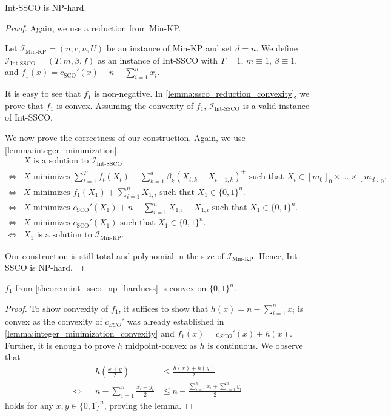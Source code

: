 \begin{theorem}
\label{theorem:int_ssco_np_hardness}
Int-SSCO is NP-hard.
\end{theorem}
\begin{proof}
Again, we use a reduction from Min-KP.

Let $\mathcal{I}_{\text{Min-KP}} = (n, c, u, U)$ be an instance of Min-KP and set $d = n$. We define $\mathcal{I}_{\text{Int-SSCO}} = (T, m, \beta, f)$ as an instance of Int-SSCO with $T = 1$, $m \equiv 1$, $\beta \equiv 1$, and $f_1(x) = c_{\text{SCO}}'(x) + n - \sum_{i=1}^n x_i$.

It is easy to see that $f_1$ is non-negative. In \autoref{lemma:ssco_reduction_convexity}, we prove that $f_1$ is convex. Assuming the convexity of $f_1$, $\mathcal{I}_{\text{Int-SSCO}}$ is a valid instance of Int-SSCO.

We now prove the correctness of our construction. Again, we use \autoref{lemma:integer_minimization}. \begin{align*}
         &X \text{ is a solution to } \mathcal{I}_{\text{Int-SSCO}} \\
    \iff &X \text{ minimizes } \sum_{t=1}^T f_t(X_t) + \sum_{k=1}^d \beta_k (X_{t,k} - X_{t-1,k})^+ \text{ such that } X_t \in [m_0]_0 \times \dots \times [m_d]_0. \\
    \iff &X \text{ minimizes } f_1(X_1) + \sum_{i=1}^n X_{1,i} \text{ such that } X_1 \in \{0,1\}^n. \\
    \iff &X \text{ minimizes } c_{\text{SCO}}'(X_1) + n + \sum_{i=1}^n X_{1,i} - X_{1,i} \text{ such that } X_1 \in \{0,1\}^n. \\
    \iff &X \text{ minimizes } c_{\text{SCO}}'(X_1) \text{ such that } X_1 \in \{0,1\}^n. \\
    \iff &X_1 \text{ is a solution to } \mathcal{I}_{\text{Min-KP}}.
\end{align*}

Our construction is still total and polynomial in the size of $\mathcal{I}_{\text{Min-KP}}$. Hence, Int-SSCO is NP-hard.
\end{proof}

\begin{lemma}
\label{lemma:ssco_reduction_convexity}
$f_1$ from \autoref{theorem:int_ssco_np_hardness} is convex on $\{0,1\}^n$.
\end{lemma}
\begin{proof}
To show convexity of $f_1$, it suffices to show that $h(x) = n - \sum_{i=1}^n x_i$ is convex as the convexity of $c_{SCO}'$ was already established in \autoref{lemma:integer_minimization_convexity} and $f_1(x) = c_{SCO}'(x) + h(x)$. Further, it is enough to prove $h$ midpoint-convex as $h$ is continuous. We observe that \begin{align*}
         &&h\left(\frac{x + y}{2}\right) &\leq \frac{h(x) + h(y)}{2} \\
    \iff &&n - \sum_{i=1}^n \frac{x_i + y_i}{2} &\leq n - \frac{\sum_{i=1}^n x_i + \sum_{i=1}^n y_i}{2}
\end{align*} holds for any $x, y \in \{0,1\}^n$, proving the lemma.
\end{proof}

